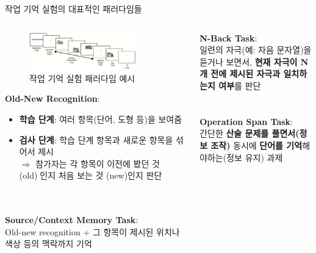 \documentclass{beamer}
\begin{document}
\begin{frame}{작업 기억 실험의 대표적인 패러다임들}
  \begin{columns}
    \begin{column}{0.5\textwidth}
      \begin{figure}
        \centering
        \includegraphics[width=0.8\textwidth]{image/work_ex_p1}
        \caption{작업 기억 실험 패러다임 예시}
      \end{figure}
      \textbf{Old-New Recognition}:\\
      \vspace{-0.5em}
      \begin{itemize}
        \small
        \item \textbf{학습 단계}: 여러 항목(단어, 도형 등)을 보여줌
        \item \textbf{검사 단계}: 학습 단계 항목과 새로운 항목을 섞어서 제시 \\$\Rightarrow$ 참가자는 각 항목이 이전에 봤던 것(old)인지 처음 보는 것 (new)인지 판단
      \end{itemize}\\~\\
      
      \textbf{Source/Context Memory Task}:\\
      {\small Old-new recognition + 그 항목이 제시된 위치나 색상 등의 맥락까지 기억}
    \end{column}
    \begin{column}{0.5\textwidth}
      \textbf{N-Back Task}:\\
      {\small 일련의 자극(예: 자음 문자열)을 듣거나 보면서, \textbf{현재 자극이 N개 전에 제시된 자극과 일치하는지 여부}를 판단}\\~\\~\\
      
      \textbf{Operation Span Task}:\\
      {\small 간단한 \textbf{산술 문제를 풀면서(정보 조작)} 동시에 \textbf{단어를 기억}해야하는(정보 유지) 과제}\\~\\~\\
      

\end{column}
\end{columns}
\end{frame}
\end{document}
